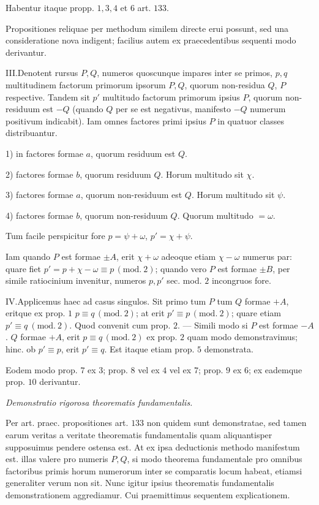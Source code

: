 Habentur itaque propp. $1,3,4$ et $6$ art. $133$.

Propositiones reliquae per methodum similem directe erui possunt, sed una consideratione nova indigent; facilius autem ex praecedentibus sequenti modo derivantur.

III.\quad Denotent rursus $P,Q$, numeros quoscunque impares inter se primos, $p,q$ multitudinem factorum primorum ipsorum $P,Q$, quorum non-residua $Q$, $P$ respective. Tandem sit $p'$ multitudo factorum primorum ipsius $P$, quorum non-residuum est $-Q$ (quando $Q$ per se est negativus, manifesto $-Q$ numerum positivum indicabit). Iam omnes factores primi ipsius $P$ in quatuor classes distribuantur.

1) in factores formae $a$, quorum residuum est $Q$.

2) factores formae $b$, quorum residuum $Q$. Horum multitudo sit $\chi$.

3) factores formae $a$, quorum non-residuum est $Q$. Horum multitudo sit $\psi$.

4) factores formae $b$, quorum non-residuum $Q$. Quorum multitudo $=\omega$.

Tum facile perspicitur fore $p=\psi+\omega$, $p'=\chi+\psi$.

Iam quando $P$ est formae $\pm A$, erit $\chi+\omega$ adeoque etiam $\chi-\omega$ numerus par: quare fiet $p'=p+\chi-\omega\equiv p\, (\mathrm{mod.}\ 2)$; quando vero $P$ est formae $\pm B$, per simile ratiocinium invenitur, numeros $p,p'$ sec. mod. $2$ incongruos fore.

IV.\quad Applicemus haec ad casus singulos. Sit primo tum $P$ tum $Q$ formae $+A$, eritque ex prop. $1$ $p\equiv q\, (\mathrm{mod.}\ 2)$; at erit $p'\equiv p\, (\mathrm{mod.}\ 2)$; quare etiam $p'\equiv q\ (\mathrm{mod.}\ 2)$. Quod convenit cum prop. $2$. --- Simili modo si $P$ est formae $-A$. $Q$ formae $+A$, erit $p\equiv q\, (\mathrm{mod.}\ 2)$ ex prop. $2$ quam modo demonstravimus; hinc. ob $p'\equiv p$, erit $p'\equiv q$. Est itaque etiam prop. $5$ demonstrata.

Eodem modo prop. $7$ ex $3$; prop. $8$ vel ex $4$ vel ex $7$; prop. $9$ ex $6$; ex eademque prop. $10$ derivantur.

\begin{center}\emph{Demonstratio rigorosa theorematis fundamentalis.}\end{center}


Per art. praec. propositiones art. $133$ non quidem sunt demonstratae, sed tamen earum veritas a veritate theorematis fundamentalis quam aliquantisper supposuimus pendere ostensa est. At ex ipsa deductionis methodo manifestum est. illas valere pro numeris $P,Q$, si modo theorema fundamentale pro omnibus factoribus primis horum numerorum inter se comparatis locum habeat, etiamsi generaliter verum non sit. Nunc igitur ipsius theorematis fundamentalis demonstrationem aggrediamur. Cui praemittimus sequentem explicationem.


